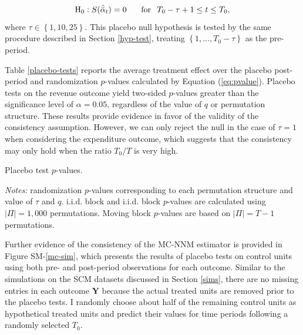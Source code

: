 \documentclass[12pt]{article}
\begin{document}
\begin{equation} \label{h0-placebo}
\text{H}_0: S (\hat{\bar{\alpha}}_{t}) = 0  \, \hspace{5mm} \,  \text{for} \, \hspace{2mm} T_0 - \tau +1 \leq t \leq T_0,
\end{equation}
where $\tau \in \left\{1, 10, 25\right\}$. This placebo null hypothesis is tested by the same procedure described in Section \ref{hyp-test}, treating $\left\{1, \ldots, T_0 - \tau\right\}$ as the pre-period.

Table \ref{placebo-tests} reports the average treatment effect over the placebo post-period and randomization $p$-values calculated by Equation (\ref{eq:pvalue}). Placebo tests on the revenue outcome yield two-sided $p$-values greater than the significance level of $\alpha = 0.05$, regardless of the value of $q$ or permutation structure. These results provide evidence in favor of the validity of the consistency assumption. However, we can only reject the null in the case of $\tau=1$ when considering the expenditure outcome, which suggests that the consistency may only hold when the ratio $T_0/T$ is very high. 

\begin{table}[htbp]
	\captionsetup{font=normalsize}
	\caption{Placebo test $p$-values.\label{placebo-tests}}
	\begin{center}
		\scalebox{.95}{}
	\end{center}
	\footnotesize{\emph{Notes:} randomization $p$-values corresponding to each permutation structure and value of $\tau$ and $q$. i.i.d. block and i.i.d. block $p$-values are calculated using $|\Pi| = 1,000$ permutations. Moving block $p$-values are based on $|\Pi| = T-1$ permutations.}
\end{table}

Further evidence of the consistency of the MC-NNM estimator is provided in Figure SM-\ref{mc-sim}, which presents the results of placebo tests on control units using both pre- and post-period observations for each outcome. Similar to the simulations on the SCM datasets discussed in Section \ref{sims}, there are no missing entries in each outcome $\mathbf{Y}$ because the actual treated units are removed prior to the placebo tests. I randomly choose about half of the remaining control units as hypothetical treated units and predict their values for time periods following a randomly selected $T_0$. 
\end{document}

